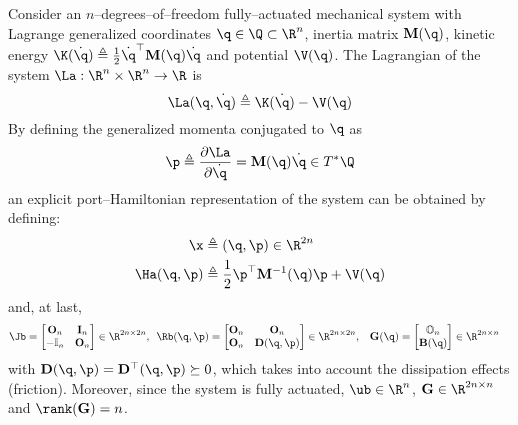 \begin{exmp}
    Consider an $n$--degrees--of--freedom fully--actuated mechanical system with Lagrange generalized coordinates $\q\in\Q\subset\R^n$, inertia matrix $\mathbf{M}(\q)$, kinetic energy $\K(\dot{\q})\triangleq\frac{1}{2}\dot{\q}^\top \mathbf{M}(\q)\dot{\q}$ and potential $\V(\q)$. The Lagrangian of the system $\La:\R^n\times\R^n\rightarrow\R$ is
    \begin{equation}
        \La(\q,\dot{\q}) \triangleq  \K(\dot{\q}) - \V(\q)
    \end{equation}
    By defining the generalized momenta conjugated to $\q$ as
    \begin{equation}
        \p \triangleq \frac{\partial \La}{\partial \dot{\q}} = \mathbf{M}(\q)\dot{\q}\in T^*\Q    
    \end{equation}
    an explicit port--Hamiltonian representation of the system can be obtained by defining:
	\begin{align}
	    \x &\triangleq (\q,\p)\in\R^{2n}\\
	    \Ha(\q,\p) &\triangleq\frac{1}{2}\p^\top\mathbf{M}^{-1}(\q)\p + \V(\q)
	\end{align}
	and, at last,
	\begin{align*}
	    \Jb = \begin{bmatrix}
	        \mathbf{O}_n&\mathbf{I}_n\\
	        -\mathbb{I}_n&\mathbf{O}_n
	    \end{bmatrix}\in\R^{2n\times 2n},~~ &
	    \Rb(\q,\p) = \begin{bmatrix}
	        \mathbf{O}_n&\mathbf{O}_n\\\mathbf{O}_n&\mathbf{D}(\q,\p)
	    \end{bmatrix}\in\R^{2n\times 2n}, &
	    \mathbf{G}(\q)=\begin{bmatrix}
	        \mathbb{O}_{n}\\\mathbf{B}(\q)
	    \end{bmatrix}\in\R^{2n\times n} &
	\end{align*}
	with $\mathbf{D}(\q,\p) = \mathbf{D}^\top(\q,\p)\succeq 0$, which takes into account the dissipation effects (friction). Moreover, since the system is fully actuated, $\ub\in\R^n$, $\mathbf{G}\in\R^{2n\times n}$ and $\rank(\mathbf{G}) = n$.
	

\end{exmp}
